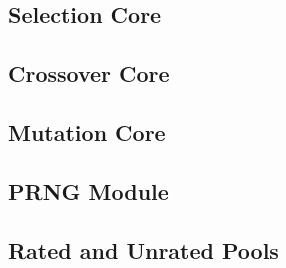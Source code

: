 \subsection {Selection Core} \label{fpga:selection:ss:selection_core}
     \label{fpga:subsection:selection_core}

\subsection{Crossover Core} \label{fpga:crossover:ss:crossover_core}
     \label{fpga:subsection:crossover_core}

\subsection{Mutation Core}\label{fpga:mutation:ss:mutation_core}
     \label{fpga:subsection:mutation_core}

\subsection{PRNG Module}

\subsection{Rated and Unrated Pools}
